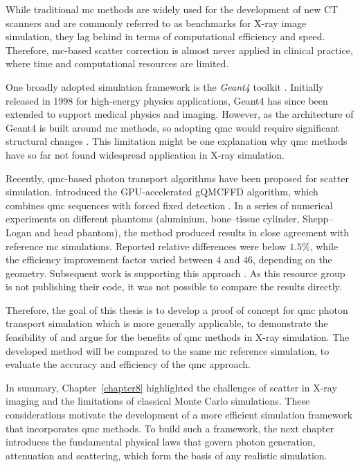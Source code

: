 While traditional \ac{mc} methods are widely used for the development of new CT
scanners and are commonly referred to as benchmarks for X-ray image simulation,
they lag behind in terms of computational efficiency and speed. Therefore,
\ac{mc}-based scatter correction is almost never applied in clinical practice,
where time and computational resources are limited.

One broadly adopted simulation framework is the \emph{Geant4} toolkit
\cite{geant4}. Initially released in 1998 for high-energy physics applications,
Geant4 has since been extended to support medical physics and imaging. However,
as the architecture of Geant4 is built around \ac{mc} methods, so adopting
\ac{qmc} would require significant structural changes
\cite{doigniesInterview2025,doignies2024echantillonnage}. This limitation might
be one explanation why \ac{qmc} methods have so far not found widespread
application in X-ray simulation.

Recently, \ac{qmc}-based photon transport algorithms have been proposed for
scatter simulation. \citeauthor{qmcXray2023} introduced the GPU-accelerated
gQMCFFD algorithm, which combines \ac{qmc} sequences with forced fixed detection
\cite{qmcXray2023}. In a series of numerical experiments on different phantoms
(aluminium, bone--tissue cylinder, Shepp--Logan and head phantom), the method
produced results in close agreement with reference \ac{mc} simulations. Reported
relative differences were below $1.5\%$, while the efficiency improvement factor
varied between $4$ and $46$, depending on the geometry. Subsequent work is
supporting this approach \cite{lin2025scatter,doignies2024echantillonnage}. As
this resource group is not publishing their code, it was not
possible to compare the results directly.

Therefore, the goal of this thesis is to develop a proof of concept for \ac{qmc}
photon transport simulation which is more generally applicable, to demonstrate
the feasibility of and argue for the benefits of \ac{qmc} methods in X-ray
simulation. The developed method will be compared to the same \ac{mc} reference
simulation, to evaluate the accuracy and efficiency of the \ac{qmc} approach.

\bigskip
In summary, Chapter~\ref{chapter8} highlighted the challenges of scatter in
X-ray imaging and the limitations of classical Monte Carlo simulations. These
considerations motivate the development of a more efficient simulation framework
that incorporates \ac{qmc} methods. To build such a framework, the next chapter
introduces the fundamental physical laws that govern photon generation,
attenuation and scattering, which form the basis of any realistic simulation.